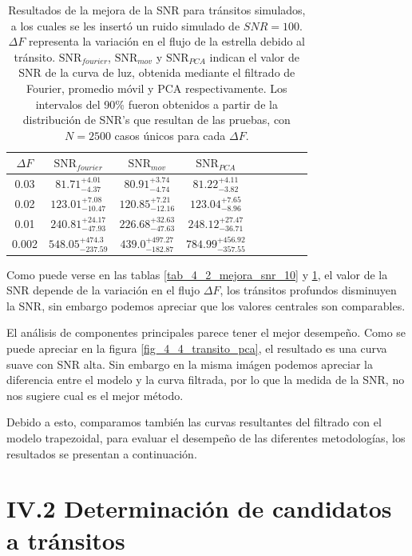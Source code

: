 \begin{table}
	\centering
	\begin{tabular}{ccccccccc}
	\hline 
	$\Delta F$ & $\mbox{SNR}_{fourier}$ &  $\mbox{SNR}_{mov}$ & $\mbox{SNR}_{PCA}$\\ 
	\hline
	0.03 & 	${81.71}_{-4.37}^{+4.01}$ & ${80.91}_{-4.74}^{+3.74}$ & ${81.22}_{-3.82}^{+4.11}$ \\
	0.02 &  ${123.01}_{-10.47}^{+7.08}$ & ${120.85}_{-12.16}^{+7.21}$ & ${123.04}_{-8.96}^{+7.65}$ \\
	0.01 & ${240.81}_{-47.93}^{+24.17}$ & ${226.68}_{-47.63}^{+32.63}$ & ${248.12}_{-36.71}^{+27.47}$ \\
	0.002 & ${548.05}_{-237.59}^{+474.3}$ & ${439.0}_{-182.87}^{+497.27}$ & ${784.99}_{-357.55}^{+456.92}$ \\
	\hline 
	\end{tabular} 
	\caption{Resultados de la mejora de la SNR para tránsitos simulados, a los cuales se les insertó un ruido simulado de $SNR=100$. $\Delta F$ representa la variación en el flujo de la estrella debido al tránsito. $\mbox{SNR}_{fourier}$, $\mbox{SNR}_{mov}$ y $\mbox{SNR}_{PCA}$ indican el valor de SNR de la curva de luz, obtenida mediante el filtrado de Fourier, promedio móvil y PCA respectivamente. Los intervalos del 90\% fueron obtenidos a partir de la distribución de SNR's que resultan de las pruebas, con $N=2500$ casos únicos para cada $\Delta F$.}
	\label{tab_4_3_mejora_snr_100}
	\end{table}

Como puede verse en las tablas \ref{tab_4_2_mejora_snr_10} y \ref{tab_4_3_mejora_snr_100}, el valor de la SNR depende de la variación en el flujo $\Delta F$, los tránsitos profundos disminuyen la SNR, sin embargo podemos apreciar que los valores centrales son comparables.

El análisis de componentes principales parece tener el mejor desempeño. Como se puede apreciar en la figura \ref{fig_4_4_transito_pca}, el resultado es una curva suave con SNR alta. Sin embargo en la misma imágen podemos apreciar la diferencia entre el modelo y la curva filtrada, por lo que la medida de la SNR, no nos sugiere cual es el mejor método.

Debido a esto, comparamos también las curvas resultantes del filtrado con el modelo trapezoidal, para evaluar el desempeño de las diferentes metodologías, los resultados se presentan a continuación.

\section*{IV.2 Determinación de candidatos a tránsitos}


